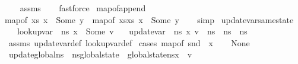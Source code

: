 \begin{isabellebody}
%
\isadelimproof
\ \ %
\endisadelimproof
%
\isatagproof
{}\isamarkupfalse%
\ assms\isanewline
\ \ \isamarkupfalse%
\ fastforce%
\endisatagproof
{\isafoldproof}%
%
\isadelimproof
\isanewline
%
\endisadelimproof
\isanewline
{}\isamarkupfalse%
\ map{\isacharunderscore}{\kern0pt}of{\isacharunderscore}{\kern0pt}append{\isacharcolon}{\kern0pt}\isanewline
{\isachardoublequoteopen}map{\isacharunderscore}{\kern0pt}of\ {\isacharparenleft}{\kern0pt}xs{}{\isacharparenright}{\kern0pt}\ x\ {\isacharequal}{\kern0pt}\ Some\ y\ {\isasymLongrightarrow}\ map{\isacharunderscore}{\kern0pt}of\ {\isacharparenleft}{\kern0pt}xs{}{\isacharat}{\kern0pt}xs{}{\isacharparenright}{\kern0pt}\ x\ {\isacharequal}{\kern0pt}\ Some\ y{\isachardoublequoteclose}\isanewline
%
\isadelimproof
\ \ %
\endisadelimproof
%
\isatagproof
{}\isamarkupfalse%
\ simp%
\endisatagproof
{\isafoldproof}%
%
\isadelimproof
\isanewline
%
\endisadelimproof
\isanewline
{}\isamarkupfalse%
\ update{\isacharunderscore}{\kern0pt}var{\isacharunderscore}{\kern0pt}same{\isacharunderscore}{\kern0pt}state{\isacharcolon}{\kern0pt}\isanewline
\ \ \ {\isachardoublequoteopen}lookup{\isacharunderscore}{\kern0pt}var\ {\isasymLambda}\ ns\ x\ {\isacharequal}{\kern0pt}\ Some\ v{\isachardoublequoteclose}\isanewline
\ \ \ {\isachardoublequoteopen}update{\isacharunderscore}{\kern0pt}var\ {\isasymLambda}\ ns\ x\ v\ {\isacharequal}{\kern0pt}\ ns{\isachardoublequoteclose}\ {\isacharparenleft}{\kern0pt}\ {\isachardoublequoteopen}{\isacharquery}{\kern0pt}ns{\isacharprime}{\kern0pt}\ {\isacharequal}{\kern0pt}\ ns{\isachardoublequoteclose}{\isacharparenright}{\kern0pt}\isanewline
%
\isadelimproof
\ \ %
\endisadelimproof
%
\isatagproof
{}\isamarkupfalse%
\ assms\ update{\isacharunderscore}{\kern0pt}var{\isacharunderscore}{\kern0pt}def\ lookup{\isacharunderscore}{\kern0pt}var{\isacharunderscore}{\kern0pt}def\isanewline
{}\isamarkupfalse%
\ {\isacharparenleft}{\kern0pt}cases\ {\isachardoublequoteopen}map{\isacharunderscore}{\kern0pt}of\ {\isacharparenleft}{\kern0pt}snd\ {\isasymLambda}{\isacharparenright}{\kern0pt}\ x{\isachardoublequoteclose}{\isacharparenright}{\kern0pt}\isanewline
\ \ \isamarkupfalse%
\ None\isanewline
\ \ \isamarkupfalse%
\ update{\isacharunderscore}{\kern0pt}global{\isacharcolon}{\kern0pt}{\isachardoublequoteopen}{\isacharquery}{\kern0pt}ns{\isacharprime}{\kern0pt}\ {\isacharequal}{\kern0pt}\ ns{\isasymlparr}global{\isacharunderscore}{\kern0pt}state\ {\isacharcolon}{\kern0pt}{\isacharequal}{\kern0pt}\ {\isacharparenleft}{\kern0pt}global{\isacharunderscore}{\kern0pt}state{\isacharparenleft}{\kern0pt}ns{\isacharparenright}{\kern0pt}{\isacharparenright}{\kern0pt}{\isacharparenleft}{\kern0pt}x\ {\isasymmapsto}\ v{\isacharparenright}{\kern0pt}{\isasymrparr}{\isachardoublequoteclose}\isanewline

\end{isabellebody}
